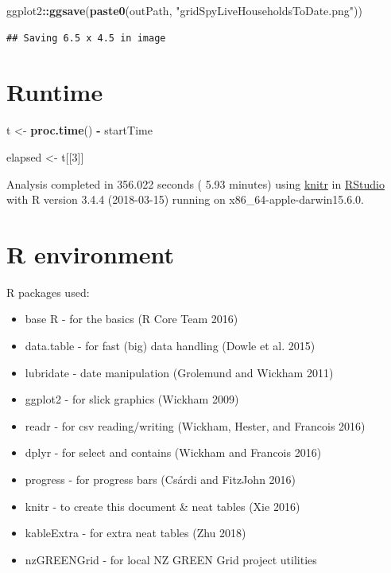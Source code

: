 \documentclass[]{article}
\newenvironment{Shaded}{\begin{snugshade}}{\end{snugshade}}
\newcommand{\KeywordTok}[1]{\textcolor[rgb]{0.13,0.29,0.53}{\textbf{#1}}}
\newcommand{\DecValTok}[1]{\textcolor[rgb]{0.00,0.00,0.81}{#1}}
\newcommand{\StringTok}[1]{\textcolor[rgb]{0.31,0.60,0.02}{#1}}
\newcommand{\OperatorTok}[1]{\textcolor[rgb]{0.81,0.36,0.00}{\textbf{#1}}}
\newcommand{\NormalTok}[1]{#1}
\providecommand{\tightlist}{%
  \setlength{\itemsep}{0pt}\setlength{\parskip}{0pt}}
\begin{document}
\begin{Shaded}
\begin{Highlighting}[]
\NormalTok{ggplot2}\OperatorTok{::}\KeywordTok{ggsave}\NormalTok{(}\KeywordTok{paste0}\NormalTok{(outPath, }\StringTok{"gridSpyLiveHouseholdsToDate.png"}\NormalTok{))}
\end{Highlighting}
\end{Shaded}

\begin{verbatim}
## Saving 6.5 x 4.5 in image
\end{verbatim}

\section{Runtime}\label{runtime}

\begin{Shaded}
\begin{Highlighting}[]
\NormalTok{t <-}\StringTok{ }\KeywordTok{proc.time}\NormalTok{() }\OperatorTok{-}\StringTok{ }\NormalTok{startTime}

\NormalTok{elapsed <-}\StringTok{ }\NormalTok{t[[}\DecValTok{3}\NormalTok{]]}
\end{Highlighting}
\end{Shaded}

Analysis completed in 356.022 seconds ( 5.93 minutes) using
\href{https://cran.r-project.org/package=knitr}{knitr} in
\href{http://www.rstudio.com}{RStudio} with R version 3.4.4 (2018-03-15)
running on x86\_64-apple-darwin15.6.0.

\section{R environment}\label{r-environment}

R packages used:

\begin{itemize}
\tightlist
\item
  base R - for the basics (R Core Team 2016)
\item
  data.table - for fast (big) data handling (Dowle et al. 2015)
\item
  lubridate - date manipulation (Grolemund and Wickham 2011)
\item
  ggplot2 - for slick graphics (Wickham 2009)
\item
  readr - for csv reading/writing (Wickham, Hester, and Francois 2016)
\item
  dplyr - for select and contains (Wickham and Francois 2016)
\item
  progress - for progress bars (Csárdi and FitzJohn 2016)
\item
  knitr - to create this document \& neat tables (Xie 2016)
\item
  kableExtra - for extra neat tables (Zhu 2018)
\item
  nzGREENGrid - for local NZ GREEN Grid project utilities
\end{itemize}
\end{document}
